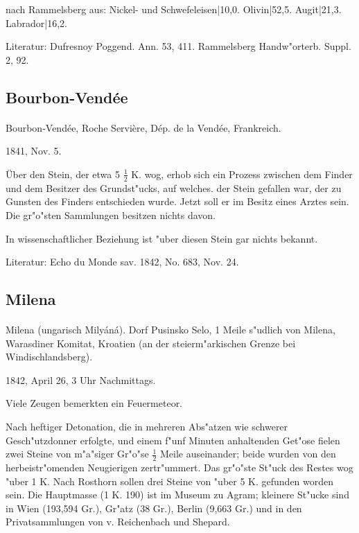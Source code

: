 \documentclass[a4paper, 11pt, oneside]{article}
\begin{document}
nach Rammelsberg aus:  
Nickel- und Schwefeleisen|10,0.  
Olivin|52,5.  
Augit|21,3.  
Labrador|16,2.

\footnotesize
Literatur: Dufresnoy Poggend. Ann. 53, 411. Rammelsberg Handw"orterb. Suppl. 2, 92.

\subsection{Bourbon-Vendée}
\normalsize
\paragraph{}
Bourbon-Vendée, Roche Servière, Dép. de la Vendée, Frankreich.

1841, Nov. 5.

Über den Stein, der etwa 5 $\frac{1}{2}$ K. wog, erhob sich ein Prozess zwischen dem Finder und dem Besitzer des Grundst"ucks, auf welches. der Stein gefallen war, der zu Gunsten des Finders entschieden wurde. Jetzt soll er im Besitz eines Arztes sein. Die gr"o"sten Sammlungen besitzen nichts davon.

In wissenschaftlicher Beziehung ist "uber diesen Stein gar nichts bekannt.

\footnotesize
Literatur: Echo du Monde sav. 1842, No. 683, Nov. 24.

\subsection{Milena}
\normalsize
\paragraph{}
Milena (ungarisch Milyáná). Dorf Pusinsko Selo, 1 Meile s"udlich von Milena, Warasdiner Komitat, Kroatien (an der steierm"arkischen Grenze bei Windischlandsberg).

1842, April 26, 3 Uhr Nachmittags.

Viele Zeugen bemerkten ein Feuermeteor.

Nach heftiger Detonation, die in mehreren Abs"atzen wie schwerer Gesch"utzdonner erfolgte, und einem f"unf Minuten anhaltenden Get"ose fielen zwei Steine von m"a"siger Gr"o"se $\frac{1}{2}$ Meile auseinander; beide wurden von den herbeistr"omenden Neugierigen zertr"ummert. Das gr"o"ste St"uck des Restes wog "uber 1 K. Nach Rosthorn sollen drei Steine von "uber 5 K. gefunden worden sein. Die Hauptmasse (1 K. 190) ist im Museum zu Agram; kleinere St"ucke sind in Wien (193,594 Gr.), Gr"atz (38 Gr.), Berlin (9,663 Gr.) und in den Privatsammlungen von v. Reichenbach und Shepard.
\end{document}
